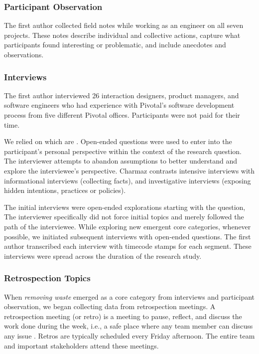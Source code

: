 \subsubsection{Participant Observation}
The first author collected field notes while working as an engineer on all seven projects. These notes describe individual and collective actions, capture what participants found interesting or problematic, and include anecdotes and observations.
\subsubsection{Interviews}
The first author interviewed 26 interaction designers, product managers, and software engineers who had experience with Pivotal's software development process from five different Pivotal offices. Participants were not paid for their time.

We relied on  which are  \cite{Charmaz}. Open-ended questions were used to enter into the participant's personal perspective within the context of the research question. The interviewer attempts to abandon assumptions to better understand and explore the interviewee's perspective. Charmaz \cite{Charmaz} contrasts intensive interviews with informational interviews (collecting facts), and investigative interviews (exposing hidden intentions, practices or policies).

The initial interviews were open-ended explorations starting with the question,  The interviewer specifically did not force initial topics and merely followed the path of the interviewee. While exploring new emergent core categories, whenever possible, we initiated subsequent interviews with open-ended questions. The first author transcribed each interview with timecode stamps for each segment. These interviews were spread across the duration of the research study. 
\subsubsection{Retrospection Topics}
When \textit{removing waste} emerged as a core category from interviews and participant observation, we began collecting data from retrospection meetings. A retrospection meeting (or retro) is a meeting to pause, reflect, and discuss the work done during the week, i.e., a safe place where any team member can discuss any issue \cite{DerbyAgileRetrospectives}. Retros are typically scheduled every Friday afternoon. The entire team and important stakeholders attend these meetings. 

